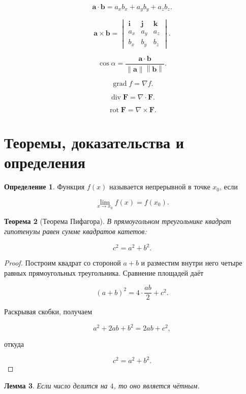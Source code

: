 \documentclass[12pt,a4paper]{article}
\newtheorem{theorem}{Теорема}[section]
\newtheorem{lemma}[theorem]{Лемма}
\theoremstyle{definition}
\newtheorem{definition}[theorem]{Определение}
\theoremstyle{remark}
\newcommand{\vect}[1]{\bm{#1}}
\newcommand{\norm}[1]{\left\lVert#1\right\rVert}
\DeclareMathOperator{\grad}{grad}
\DeclareMathOperator{\divergence}{div}
\DeclareMathOperator{\rot}{rot}
\begin{document}
\[
    \vect{a}\cdot\vect{b}
    =
    a_xb_x+a_yb_y+a_zb_z.
\]

\[
    \vect{a}\times\vect{b}
    =
    \begin{vmatrix}
        \vect{i}&\vect{j}&\vect{k}\\
        a_x&a_y&a_z\\
        b_x&b_y&b_z
    \end{vmatrix}.
\]

\[
    \cos\alpha
    =
    \frac{\vect{a}\cdot\vect{b}}
    {\norm{\vect{a}}\norm{\vect{b}}}.
\]

\[
    \grad f
    =
    \nabla f.
\]

\[
    \divergence\vect{F}
    =
    \nabla\cdot\vect{F}.
\]

\[
    \rot\vect{F}
    =
    \nabla\times\vect{F}.
\]


\section{Теоремы, доказательства и определения}

\begin{definition}
Функция $f(x)$ называется непрерывной в точке $x_0$, если

\[
    \lim_{x\to x_0}f(x)=f(x_0).
\]
\end{definition}

\begin{theorem}[Теорема Пифагора]
В прямоугольном треугольнике квадрат гипотенузы равен сумме квадратов
катетов:

\[
    c^2=a^2+b^2.
\]
\end{theorem}

\begin{proof}
Построим квадрат со стороной $a+b$ и разместим внутри него четыре
равных прямоугольных треугольника. Сравнение площадей даёт

\[
    (a+b)^2=4\cdot\frac{ab}{2}+c^2.
\]

Раскрывая скобки, получаем

\[
    a^2+2ab+b^2=2ab+c^2,
\]

откуда

\[
    c^2=a^2+b^2.
\]
\end{proof}

\begin{lemma}
Если число делится на $4$, то оно является чётным.
\end{lemma}
\end{document}
